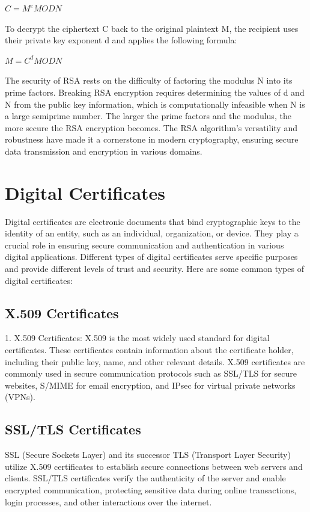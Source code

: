 \documentclass[
12pt,
oneside, 
onehalfspacing, 
nolistspacing, 
parskip, 
chapterinoneline, 
]{AASTCOMPUTER}
\begin{document}
$C = M^{e} MOD N$

To decrypt the ciphertext C back to the original plaintext M, the recipient uses their private key exponent d and applies the following formula:

$M = C^{d} MOD N$

The security of RSA rests on the difficulty of factoring the modulus N into its prime factors. Breaking RSA encryption requires determining the values of d and N from the public key information, which is computationally infeasible when N is a large semiprime number. The larger the prime factors and the modulus, the more secure the RSA encryption becomes. The RSA algorithm's versatility and robustness have made it a cornerstone in modern cryptography, ensuring secure data transmission and encryption in various domains.

\chapter{Digital Certificates}
Digital certificates are electronic documents that bind cryptographic keys to the identity of an entity, such as an individual, organization, or device. They play a crucial role in ensuring secure communication and authentication in various digital applications. Different types of digital certificates serve specific purposes and provide different levels of trust and security. Here are some common types of digital certificates:
\section{X.509 Certificates}
1. X.509 Certificates: X.509 is the most widely used standard for digital certificates. These certificates contain information about the certificate holder, including their public key, name, and other relevant details. X.509 certificates are commonly used in secure communication protocols such as SSL/TLS for secure websites, S/MIME for email encryption, and IPsec for virtual private networks (VPNs).
\section{SSL/TLS Certificates}
SSL (Secure Sockets Layer) and its successor TLS (Transport Layer Security) utilize X.509 certificates to establish secure connections between web servers and clients. SSL/TLS certificates verify the authenticity of the server and enable encrypted communication, protecting sensitive data during online transactions, login processes, and other interactions over the internet.
\end{document}
